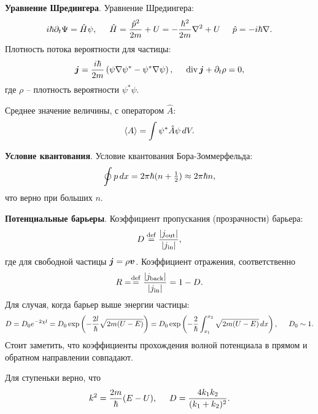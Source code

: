 
\textbf{Уравнение Шредингера}. 
Уравнение Шредингера:
\begin{equation*}
    i \hbar \partial_t \Psi = \hat{H} \psi, 
    \hspace{5 mm} 
    \hat{H} = \frac{\hat{p}^2}{2m} + U = - \frac{\hbar^2}{2m} \nabla^2 + U
    \hspace{5 mm} 
    \hat{p} = - i \hbar \nabla.
\end{equation*}
Плотность потока вероятности  для частицы:
\begin{equation*}
    \mbox{\boldmath $j$} = \frac{i\hbar}{2m} \left(
        \psi \nabla \psi^* - \psi^* \nabla \psi
    \right),
    \hspace{5 mm} 
    \mathop{\mathrm{div}}\nolimits \mbox{\boldmath $j$} + \partial_t \rho = 0,
\end{equation*}
где $\rho$ -- плотность вероятности $\psi^* \psi$. 

Среднее значение величины, с оператором $\hat{A}$:
\begin{equation*}
    \langle A\rangle = \int \psi^* \hat{A} \psi \, d V.
\end{equation*}

\textbf{Условие квантования}. Условие квантования Бора-Зоммерфельда:
\begin{equation*}
    \oint p \, d x = 2 \pi \hbar (n + \tfrac{1}{2}) \approx  2 \pi \hbar n,
\end{equation*}
что верно при больших $n$. 



\textbf{Потенциальные барьеры}. Коэффициент пропускания (прозрачности) барьера:
\begin{equation*}
    D \overset{\mathrm{def}}{=}  \frac{|j_{\textnormal{out}}|}{|j_{\textnormal{in}}|},
\end{equation*}
где для свободной частицы $\mbox{\boldmath $j$} = \rho \mbox{\boldmath $v$}$.  Коэффициент отражения, соответственно
\begin{equation*}
    R = \overset{\mathrm{def}}{=}  \frac{|j_{\textnormal{back}}|}{|j_{\textnormal{in}}|} = 1 - D.
\end{equation*}
Для случая, когда барьер выше энергии частицы:
\begin{equation*}
    D = D_0 e^{- 2 \chi l} = D_0 \exp\left(
        - \frac{2 l}{\hbar} \sqrt{2m (U - E)}
    \right) = 
    D_0 \exp\left(
        - \frac{2}{\hbar} \int\nolimits_{x_1}^{x_2}  \sqrt{2m(U-E)} \, d x
    \right),
    \hspace{5 mm} 
    D_0 \sim 1.
\end{equation*}
Стоит заметить, что коэффициенты прохождения волной потенциала в прямом и обратном направлении совпадают. 

Для ступеньки верно, что
\begin{equation*}
    k^2 = \frac{2m}{\hbar}(E-U),
    \hspace{5 mm} 
    D = \frac{4 k_1 k_2}{(k_1 + k_2)^2}.
\end{equation*}


